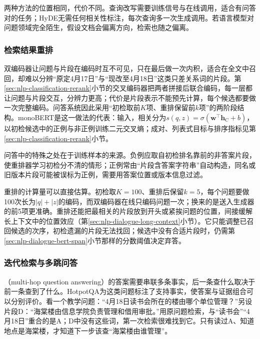 两种方法的位置相同，代价不同。查询改写需要训练信号与在线调用，适合有问答对的任务；HyDE无需任何相关性标注，每次查询多一次生成调用。若语言模型对问题领域完全陌生，假设文档会偏离方向，检索也随之偏离。

\subsubsection{检索结果重排}
\label{sec:nlp-dialogue-rerank}

双编码器让问题与片段在编码时互不可见，只在最后做一次内积，适合在全文中召回，却难以分辨“原定4月17日”与“现改至4月18日”这类只差关系词的片段。第\ref{sec:nlp-classification-rerank}小节的交叉编码器把两者拼接后联合编码，每一层都让问题与片段交互，分辨力更高；代价是片段表示不能预先计算，每个候选都要做一次完整编码。问答系统因此采用“初检取前$K$项、重排保留前$k$项”的两阶段结构。monoBERT是这一做法的代表：输入，相关分为$s(q,z)=\sigma(\bm w^{\top}\bm h_{\mathrm C}+b)$，以初检候选中的正例与非正例训练二元交叉熵；成对、列表式目标与排序指标见第\ref{sec:nlp-classification-rerank}小节。

问答中的特殊之处在于训练样本的来源。负例应取自初检排名靠前的非答案片段，使重排器学习初检分不清的情形；正例常由“片段含答案字符串”自动构造，同名或旧版本片段可能被误标为正例，需要用答案位置或版本信息过滤。

重排的计算量可以直接估算。初检取$K=100$、重排后保留$k=5$，每个问题要做100次长为$|q|+|z|$的编码，而双编码器在线只编码问题一次；换来的是送入生成器的前5项更准确。重排还能把最相关的片段放到开头或紧挨问题的位置，间接缓解长上下文中的位置效应（第\ref{sec:nlp-dialogue-long-context}小节）。它只能调整已召回候选的次序，初检遗漏的片段无法找回；候选中没有合适片段时，仍需第\ref{sec:nlp-dialogue-bert-span}小节那样的分数阈值决定弃答。

\subsubsection{迭代检索与多跳问答}
\label{sec:nlp-dialogue-iterative}

（multi-hop question answering）的答案需要串联多条事实，后一条查什么取决于前一条查到了什么。HotpotQA为这类问题标注了支持事实，使答案与证据组合可以分别评价。看一个教学问题：“4月18日读书会所在的楼由哪个单位管理？”另设片段D：“海棠楼由信息学院负责管理和借用审批。”用原问题检索，与“读书会”“4月18日”重合的是A；D中没有这些词，第一次检索很难找到它。只有读过A、知道地点是海棠楼，才知道下一步该查“海棠楼由谁管理”。

